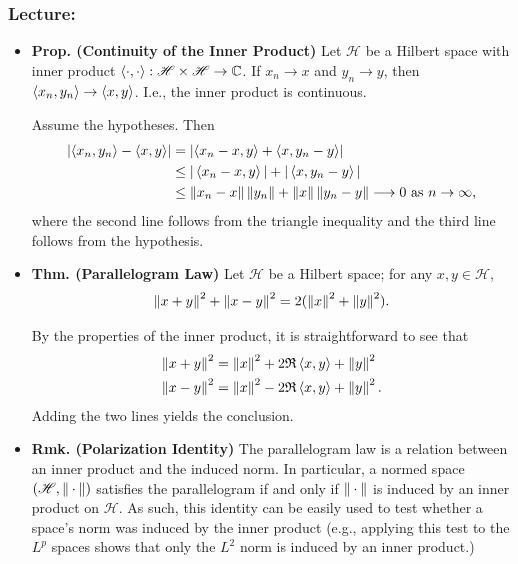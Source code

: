 \documentclass{article}
\begin{document}
\subsubsection{Lecture:}
\begin{itemize}
	\item \textbf{Prop. (Continuity of the Inner Product)} Let $\mathscr{H}$ be a Hilbert space with inner product $\braket{\cdot,\cdot}: \mathscr{H}\times \mathscr{H} \to \mathbb{C}$. If $x_{n} \to x$ and $y_{n} \to y$, then $\braket{x_{n}, y_{n}} \to \braket{x,y}$. I.e., the inner product is continuous. \newline 
	\begin{solutions}
		Assume the hypotheses. Then 
			\begin{align}
				\begin{split}
					\left| \braket{x_{n}, y_{n}} - \braket{x,y} \right| &= \left| \braket{x_{n} - x, y} + \braket{x, y_{n} - y} \right| \\
					&\leq |\braket{x_{n} - x, y}| + |\braket{x,y_{n} - y}| \\
					&\leq \left\Vert x_{n} - x \right\Vert\left\Vert y_{n} \right\Vert + \left\Vert x \right\Vert\left\Vert y_{n} - y \right\Vert \longrightarrow 0 \text{ as $n \to \infty$}, 
				\end{split}
			\end{align}
		where the second line follows from the triangle inequality and the third line follows from the hypothesis. 
	\end{solutions}
	\item \textbf{Thm. (Parallelogram Law)} Let $\mathscr{H}$ be a Hilbert space; for any $x, y \in \mathscr{H}$, 
		\begin{equation*}
			\left\Vert x + y \right\Vert^{2} + \left\Vert x - y \right\Vert^{2} = 2(\left\Vert x \right\Vert^{2} + \left\Vert y \right\Vert^{2}).
		\end{equation*}
	\begin{solutions}
		By the properties of the inner product, it is straightforward to see that 
			\begin{align}
				\begin{split} 
				\left\Vert x + y \right\Vert^{2} &= \left\Vert x \right\Vert^{2} + 2\mathfrak{R}\braket{x,y} + \left\Vert y \right\Vert^{2}  \\
				\left\Vert x - y \right\Vert^{2} &= \left\Vert x \right\Vert^{2} -2\mathfrak{R}\braket{x,y} + \left\Vert y \right\Vert^{2}. 
				\end{split} 
			\end{align}
		Adding the two lines yields the conclusion. 
	\end{solutions}
	\item \textbf{Rmk. (Polarization Identity)} The parallelogram law is a relation between an inner product and the induced norm. In particular, a normed space $(\mathscr{H}, \left\Vert \hspace{2pt}\cdot\hspace{2pt} \right\Vert)$ satisfies the parallelogram if and only if $\left\Vert \hspace{2pt}\cdot\hspace{2pt} \right\Vert$ is induced by an inner product on $\mathscr{H}$. As such, this identity can be easily used to test whether a space's norm was induced by the inner product (e.g., applying this test to the $L^{p}$ spaces shows that only the $L^{2}$ norm is induced by an inner product.)	

\end{itemize}
\end{document}
